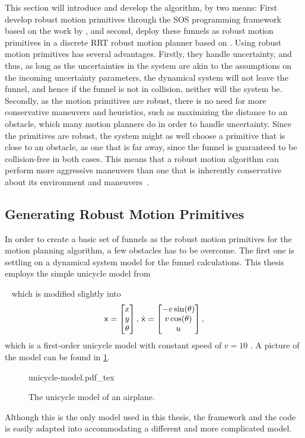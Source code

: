 This section will introduce and develop the \rrtfunnel{} algorithm, by two
means: First develop robust motion primitives through the \ac{SOS} programming
framework based on the work by \cite{majumdarFunnelLibrariesRealtime2017},
and second, deploy these funnels as robust motion primitives in a discrete
\ac{RRT} robust motion planner based on \cite{Lav06}. Using robust motion
primitives has several advantages. Firstly, they handle uncertainty, and thus,
as long as the uncertainties in the system are akin to the assumptions on the
incoming uncertainty parameters, the dynamical system will not leave the funnel,
and hence if the funnel is not in collision, neither will the system be.
Secondly, as the motion primitives are robust, there is no need for more
conservative maneuvers and heuristics, such as maximizing the distance to an
obstacle, which many motion planners do in order to handle uncertainty. Since
the primitives are robust, the system might as well choose a primitive that is
close to an obstacle, as one that is far away, since the funnel is guaranteed to
be collision-free in both cases. This means that a robust motion algorithm can
perform more aggressive maneuvers than one that is inherently conservative about
its environment and maneuvers~\cite{singhRobustOnlineMotion2017}.


\subsection{Generating Robust Motion Primitives}
\label{sec:generating-robust-motion-primitives}

In order to create a basic set of funnels as the robust motion primitives for
the \rrtfunnel{} motion planning algorithm, a few obstacles has to be overcome.
The first one is settling on a dynamical system model for the funnel
calculations. This thesis employs the simple unicycle model from
\author{Lav06}~\cite[613]{Lav06} which is modified slightly into
\begin{equation}
  \label{eq:model-dynamics}
  {\mathbf{\mathsf{x}}} =
  \begin{bmatrix}
    x \\ y \\ \theta \\
  \end{bmatrix}, \, \dot{{\mathbf{\mathsf{x}}}} =
  \begin{bmatrix}
    -v \sin(\theta) \\
    v \cos(\theta) \\
    u \\
  \end{bmatrix}
  ,
\end{equation}
which is a first-order unicycle model with constant speed of
\(v=10\) . A picture of the model can be found in
\cref{fig:second-order-unicycle}.
\begin{figure}[!t]
  \def\svgwidth{\columnwidth}
  {unicycle-model.pdf_tex}
  \caption{The unicycle model of an airplane.}
  \label{fig:second-order-unicycle}
\end{figure}
Although this is the only model used in this thesis, the framework and the code
is easily adapted into accommodating a different and more complicated model.